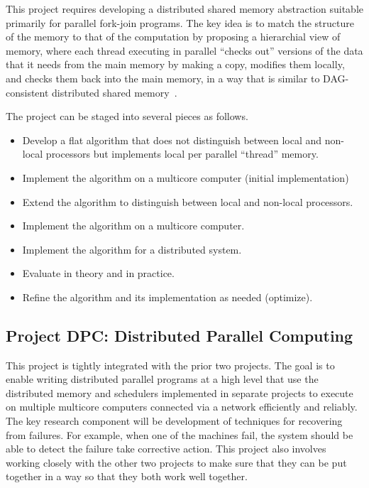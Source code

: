 \documentclass[11pt]{article}
\begin{document}
This project requires developing a distributed shared memory
abstraction suitable primarily for parallel fork-join programs.  The
key idea is to match the structure of the memory to that of the
computation by proposing a hierarchial view of memory, where each
thread executing in parallel ``checks out'' versions of the data that
it needs from the main memory by making a copy, modifies them locally,
and checks them back into the main memory, in a way that is similar to
DAG-consistent distributed shared memory~\cite{BFJLR96}.

The project can be staged into several pieces as follows.
\begin{itemize}
\item Develop a flat algorithm that does not distinguish between local
  and non-local processors but implements local per parallel
  ``thread'' memory.
\item Implement the algorithm on a multicore computer (initial
  implementation)
\item Extend the algorithm to distinguish between local and non-local
  processors.
\item Implement the algorithm on a multicore computer.
\item Implement the algorithm for a distributed system.
\item Evaluate in theory and in practice.
\item Refine the algorithm and its implementation as needed (optimize).
\end{itemize}

\subsection{Project DPC: Distributed Parallel Computing}
This project is tightly integrated with the prior two projects.  The
goal is to enable writing distributed parallel programs at a high
level that use the distributed memory and schedulers implemented in
separate projects to execute on multiple multicore computers connected
via a network efficiently and reliably.  The key research component
will be development of techniques for recovering from failures.  For
example, when one of the machines fail, the system should be able to
detect the failure take corrective action. This project also involves
working closely with the other two projects to make sure that they can
be put together in a way so that they both work well together.



{%
\setlength{\bibsep}{1pt}

}
\end{document}
